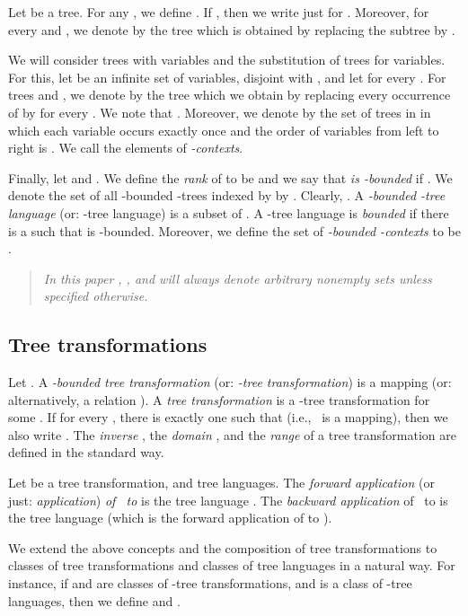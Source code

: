 \documentclass[10pt]{scrartcl}
\begin{document}
Let  be a tree. For any , we define . If , then we write just  for . 
Moreover, for every  and , we denote by  the tree which is obtained by replacing the subtree  by .

We will consider trees with variables and the substitution of trees for variables. For this, let  be an infinite set of variables, disjoint with , and let   for every . For trees  and , we denote by
 the tree which we obtain by replacing  every occurrence of  by  for every . We note that . Moreover, we denote by  the set of trees in  in which each variable  occurs exactly once and the order of variables from left to right is . We call the elements of 
 {\em -contexts}.


Finally, let  and . 
We define the \emph{rank}  of  to be  and  we say that {\em  is -bounded} if . We denote 
the set of all -bounded -trees indexed by  by . Clearly, .
A \emph{-bounded -tree language} (or: -tree language) is a subset of . 
A -tree language  is \emph{bounded} if there is a  such that  is -bounded. 
Moreover, we define the set of {\em -bounded -contexts} to be .



\begin{quote}\it In this paper , , and  will always denote arbitrary nonempty sets unless specified otherwise.
\end{quote} 



\subsection{Tree transformations}\label{sect:tree-trans}


Let . A \emph{-bounded tree transformation} (or: \emph{-tree transformation}) is a mapping  (or: alternatively, a relation ). A \emph{tree transformation} is a -tree transformation for some .  If for every , there is exactly one  such that  (i.e., ~is a
mapping), then we also write . The {\em inverse }, the {\em domain },
and the {\em range } of a tree transformation  are defined in the standard way.



Let  be a tree transformation,  and  tree languages.
The \emph{forward   application} (or just: {\em application}) \emph{of~ to } is the tree language . The \emph{backward application} of~ to  is the tree
language  (which is
the forward application of  to ).

We extend the above concepts and the composition of tree transformations to classes of tree transformations and classes of tree languages in a natural way. For instance, if  and  are classes of -tree transformations, and  is a class of -tree languages, then we define  and .
\end{document}
